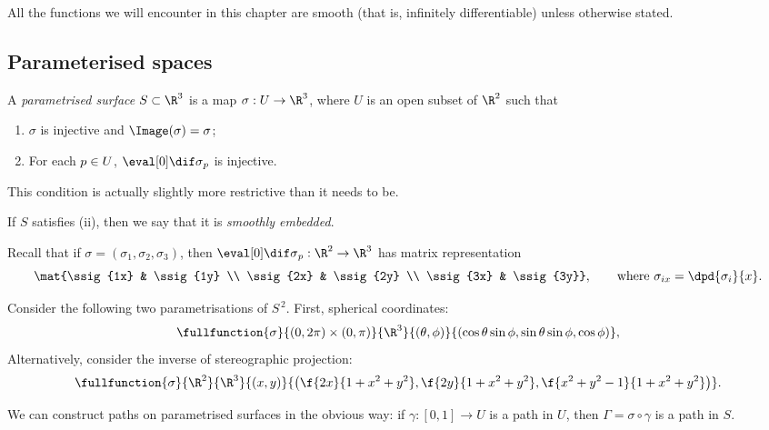 \setcounter{lecture}{4}

All the functions we will encounter in this chapter are smooth (that is, infinitely differentiable) unless otherwise stated.

\subsection{Parameterised spaces} %
\label{sub:parameterised_spaces}

\begin{definition}
	A \emph{parametrised surface} $S\subset\R^3$ is a map $\sigma:U\to\R^3$, where $U$ is an open subset of $\R^2$ such that
	\begin{enumerate}
		\shortskip
		\item $\sigma$ is injective and $\Image(\sigma)=\sigma$;
		\item For each $p\in U$, $\ddif{\sigma}{\pp}$ is injective.
	\end{enumerate}
	This condition is actually slightly more restrictive than it needs to be.

	If $S$ satisfies (ii), then we say that it is \emph{smoothly embedded}.
\end{definition}

Recall that if $\sigma=(\sigma_1,\sigma_2,\sigma_3)$, then $\ddif{\sigma}{\pp}:\R^2\to\R^3$ has matrix representation
$$\mat{\ssig{1x} & \ssig{1y} \\
\ssig{2x} & \ssig{2y} \\
\ssig{3x} & \ssig{3y}}, \qquad
\text{where $\sigma_{ix} = \dpd{\sigma_i}{x}$.}$$

\begin{example}
	Consider the following two parametrisations of $S^{\,2}$. First, spherical coordinates:
	\begin{equation*}
		\fullfunction{\sigma}{(0,2\pi) \times (0,\pi)}{\R^3}{(\theta,\phi)}{(\cos\theta \sin\phi, \sin\theta\sin\phi, \cos\phi)},
	\end{equation*}
	Alternatively, consider the inverse of stereographic projection:
	\begin{equation*}
		\fullfunction{\sigma}{\R^2}{\R^3}{(x,y)}{\left( \f{2x}{1+x^2+y^2}, \f{2y}{1+x^2+y^2}, \f{x^2+y^2-1}{1+x^2+y^2} \right)}.
	\end{equation*}
\end{example}

We can construct paths on parametrised surfaces in the obvious way: if $\gamma:[0,1] \to U$ is a path in $U$, then $\Gamma = \sigma \circ \gamma$ is a path in $S$.

